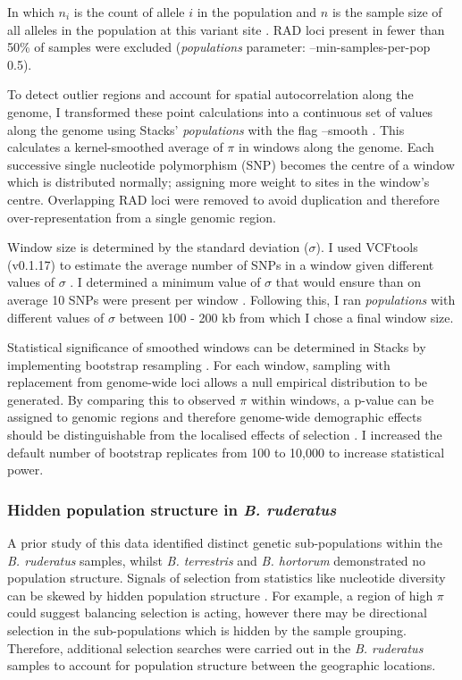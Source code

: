 \documentclass[12pt]{article}
\begin{document}
\begin{linenumbers}
		In which $n_i$ is the count of allele $i$ in the population and $n$ is the sample size of all alleles in the population at this variant site \citep{hohenlohe_population_2010}. RAD loci present in fewer than 50\% of samples were excluded (\emph{populations} parameter: --min-samples-per-pop 0.5). 
		
		To detect outlier regions and account for spatial autocorrelation along the genome, I transformed these point calculations into a continuous set of values along the genome using Stacks' \emph{populations} with the flag --smooth \citep{catchen_stacks_2013}.
		This calculates a kernel-smoothed average of $\pi$ in windows along the genome. Each successive single nucleotide polymorphism (SNP) becomes the centre of a window which is distributed normally; assigning more weight to sites in the window's centre. Overlapping RAD loci were removed to avoid duplication and therefore over-representation from a single genomic region. 
		
		Window size is determined by the standard deviation ($\sigma$). I used VCFtools (v0.1.17) to estimate the average number of SNPs in a window given different values of $\sigma$ \citep{danecek_variant_2011}. I determined a minimum value of $\sigma$ that would ensure than on average 10 SNPs were present per window \citep{buckley_restriction_2018}. Following this, I ran \emph{populations} with different values of $\sigma$ between 100 - 200 kb from which I chose a final window size. 
		
		Statistical significance of smoothed windows can be determined in Stacks by implementing bootstrap resampling \citep{hohenlohe_population_2010, catchen_stacks_2013}. For each window, sampling with replacement from genome-wide loci allows a null empirical distribution to be generated. By comparing this to observed $\pi$ within windows, a p-value can be assigned to genomic regions and therefore genome-wide demographic effects should be distinguishable from the localised effects of selection \citep{hohenlohe_population_2012, ahrens_search_2018}. I increased the default number of bootstrap replicates from 100 to 10,000 to increase statistical power. 
		
		\subsubsection{Hidden population structure in \emph{B. ruderatus}}
		
		A prior study of this data identified distinct genetic sub-populations within the \emph{B. ruderatus} samples, whilst \emph{B. terrestris} and \emph{B. hortorum} demonstrated no population structure.
		Signals of selection from statistics like nucleotide diversity can be skewed by hidden population structure \citep{hohenlohe_using_2010}. For example, a region of high $\pi$ could suggest balancing selection is acting, however there may be directional selection in the sub-populations which is hidden by the sample grouping. Therefore, additional selection searches were carried out in the \emph{B. ruderatus} samples to account for population structure between the geographic locations. 
		

\end{linenumbers}
\end{document}
